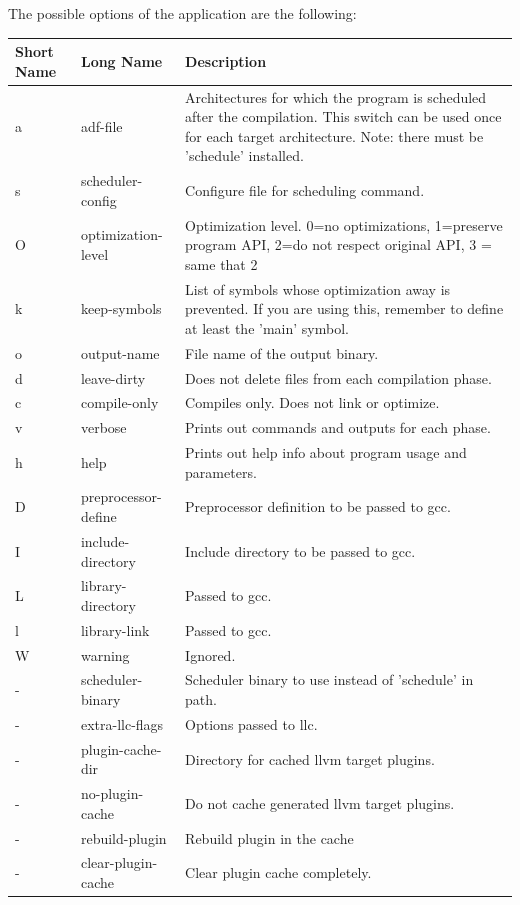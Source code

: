 \documentclass[a4paper,twoside]{tceusermanual}
\begin{document}
The possible options of the application are the following:\\
\begin{longtable}[htb]{@{}p{}@{}p{}%
                     @{}p{}}
\textbf{Short Name} &\textbf{Long Name} &\textbf{Description} \\
\hline
a & adf-file & Architectures for which the program is scheduled after the 
                        compilation. This switch can be used once for each 
                        target architecture. Note: there must be 'schedule'
                        installed.\\
s & scheduler-config & Configure file for scheduling command. \\
O & optimization-level & Optimization level. 0=no optimizations, 1=preserve
                       program API, 2=do not respect original API, 3 = same
                       that 2 \\
k & keep-symbols & List of symbols whose optimization away is prevented.
                   If you are using this, remember to define at least the
                   'main' symbol. \\
o & output-name & File name of the output binary. \\
d & leave-dirty & Does not delete files from each compilation phase. \\
c & compile-only & Compiles only. Does not link or optimize. \\
v & verbose & Prints out commands and outputs for each phase. \\
h & help & Prints out help info about program usage and parameters.\\
D & preprocessor-define & Preprocessor definition to be passed to gcc. \\
I & include-directory & Include directory to be passed to gcc. \\
L & library-directory & Passed to gcc. \\
l & library-link & Passed to gcc. \\
W & warning & Ignored. \\
- & scheduler-binary & Scheduler binary to use instead of 'schedule' in path. \\
- & extra-llc-flags & Options passed to llc. \\
- & plugin-cache-dir & Directory for cached llvm target plugins. \\
- & no-plugin-cache & Do not cache generated llvm target plugins. \\
- & rebuild-plugin & Rebuild plugin in the cache \\
- & clear-plugin-cache & Clear plugin cache completely. \\
\end{longtable}
\end{document}
